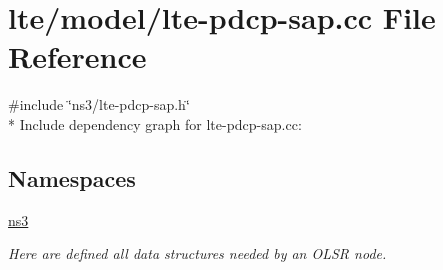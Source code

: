 \hypertarget{lte-pdcp-sap_8cc}{}\section{lte/model/lte-\/pdcp-\/sap.cc File Reference}
\label{lte-pdcp-sap_8cc}
{\ttfamily \#include \char`\"{}ns3/lte-\/pdcp-\/sap.\+h\char`\"{}}\\*
Include dependency graph for lte-\/pdcp-\/sap.cc\+:
\subsection*{Namespaces}
\begin{DoxyCompactItemize}
\item 
 \hyperlink{namespacens3}{ns3}
\begin{DoxyCompactList}\small\item\em Here are defined all data structures needed by an O\+L\+SR node. \end{DoxyCompactList}\end{DoxyCompactItemize}
